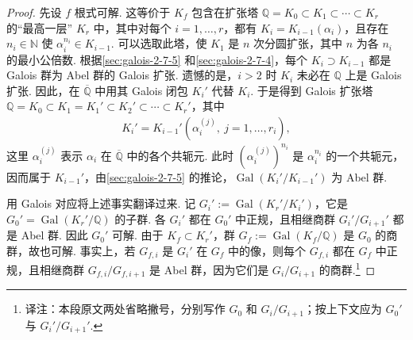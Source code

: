 \begin{proof}
先设 $f$ 根式可解. 这等价于 $K_f$ 包含在扩张塔 $\mathbb Q=K_0\subset K_1\subset\cdots\subset K_r$ 的``最高一层'' $K_r$ 中，其中对每个 $i=1,\ldots,r$，都有 $K_i=K_{i-1}(\alpha_i)$，且存在 $n_i\in\mathbb N$ 使 $\alpha_i^{n_i}\in K_{i-1}$. 可以选取此塔，使 $K_1$ 是 $n$ 次分圆扩张，其中 $n$ 为各 $n_i$ 的最小公倍数. 根据\ref{sec:galois-2-7-5} 和\ref{sec:galois-2-7-4}，每个 $K_i\supset K_{i-1}$ 都是 Galois 群为 Abel 群的 Galois 扩张. 遗憾的是，$i>2$ 时 $K_i$ 未必在 $\mathbb Q$ 上是 Galois 扩张. 因此，在 $\overline{\mathbb Q}$ 中用其 Galois 闭包 $K_i'$ 代替 $K_i$. 于是得到 Galois 扩张塔 $\mathbb Q=K_0\subset K_1=K_1'\subset K_2'\subset\cdots\subset K_r'$，其中
\begin{align*}
K_i'=K_{i-1}'(\alpha_i^{(j)},\ j=1,\ldots,r_i),
\end{align*}
这里 $\alpha_i^{(j)}$ 表示 $\alpha_i$ 在 $\overline{\mathbb Q}$ 中的各个共轭元. 此时 $(\alpha_i^{(j)})^{n_i}$ 是 $\alpha_i^{n_i}$ 的一个共轭元，因而属于 $K_{i-1}'$，由\ref{sec:galois-2-7-5} 的推论，$\operatorname{Gal}(K_i'/K_{i-1}')$ 为 Abel 群.

用 Galois 对应将上述事实翻译过来. 记 $G_i':=\operatorname{Gal}(K_r'/K_i')$，它是 $G_0'=\operatorname{Gal}(K_r'/\mathbb Q)$ 的子群. 各 $G_i'$ 都在 $G_0'$ 中正规，且相继商群 $G_i'/G_{i+1}'$ 都是 Abel 群. 因此 $G_0'$ 可解. 由于 $K_f\subset K_r'$，群 $G_f:=\operatorname{Gal}(K_f/\mathbb Q)$ 是 $G_0$ 的商群，故也可解. 事实上，若 $G_{f,i}$ 是 $G_i'$ 在 $G_f$ 中的像，则每个 $G_{f,i}$ 都在 $G_f$ 中正规，且相继商群 $G_{f,i}/G_{f,i+1}$ 是 Abel 群，因为它们是 $G_i/G_{i+1}$ 的商群.\footnote{译注：本段原文两处省略撇号，分别写作 $G_0$ 和 $G_i/G_{i+1}$；按上下文应为 $G_0'$ 与 $G_i'/G_{i+1}'$.}


\end{proof}
